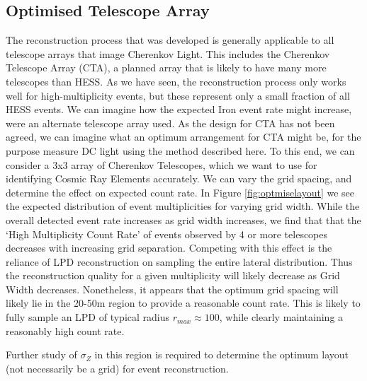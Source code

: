 \documentclass[11pt]{article}
\begin{document}
\subsection{Optimised Telescope Array}
The reconstruction process that was developed is generally applicable to all telescope arrays that image Cherenkov Light. This includes the Cherenkov Telescope Array (CTA), a planned array that is likely to have many more telescopes than HESS. As we have seen, the reconstruction process only works well for high-multiplicity events, but these represent only a small fraction of all HESS events. We can imagine how the expected Iron event rate might increase, were an alternate telescope array used. As the design for CTA has not been agreed, we can imagine what an optimum arrangement for CTA might be, for the purpose measure DC light using the method described here. To this end, we can consider a 3x3 array of Cherenkov Telescopes, which we want to use for identifying Cosmic Ray Elements accurately. We can vary the grid spacing, and determine the effect on expected count rate. In Figure \ref{fig:optmiselayout} we see the expected distribution of event multiplicities for varying grid width. While the overall detected event rate increases as grid width increases, we find that that the \textquoteleft High Multiplicity Count Rate' of events observed by 4 or more telescopes decreases with increasing grid separation. Competing with this effect is the reliance of LPD reconstruction on sampling the entire lateral distribution. Thus the reconstruction quality for a given multiplicity will likely decrease as Grid Width decreases. Nonetheless, it appears that the optimum grid spacing will likely lie in the 20-50m region to provide a reasonable count rate. This is likely to fully sample an LPD of typical radius $r_{max} \approx 100$, while clearly maintaining a reasonably high count rate.

Further study of $\sigma_{Z}$ in this region is required to determine the optimum layout (not necessarily be a grid) for event reconstruction. 
\end{document}
